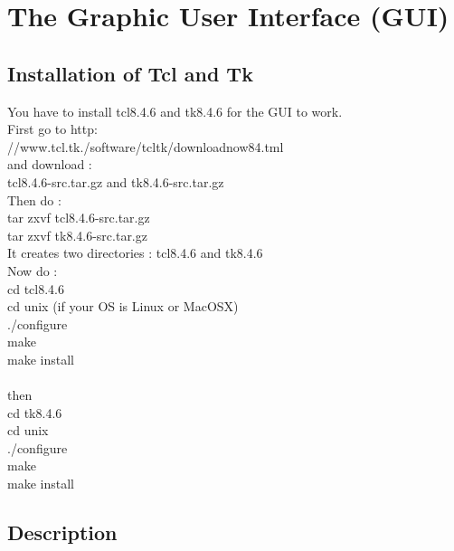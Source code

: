 \documentclass[a4paper]{report}
\begin{document}
\chapter{The Graphic User Interface (GUI)}

\section{Installation of Tcl and Tk}

You have to install tcl8.4.6 and tk8.4.6 for the GUI to work.\\
First go to http:\\
//www.tcl.tk./software/tcltk/downloadnow84.tml \\
and download :\\
tcl8.4.6-src.tar.gz and tk8.4.6-src.tar.gz\\
Then do :\\
tar zxvf tcl8.4.6-src.tar.gz\\
tar zxvf tk8.4.6-src.tar.gz\\
It creates two directories : tcl8.4.6 and tk8.4.6\\
Now do : \\
cd tcl8.4.6\\
cd unix (if your OS is Linux or MacOSX)\\
./configure\\
make\\
make install\\
\\
then \\
cd tk8.4.6\\
cd unix\\
./configure\\
make\\
make install\\

\section{Description}
\end{document}
